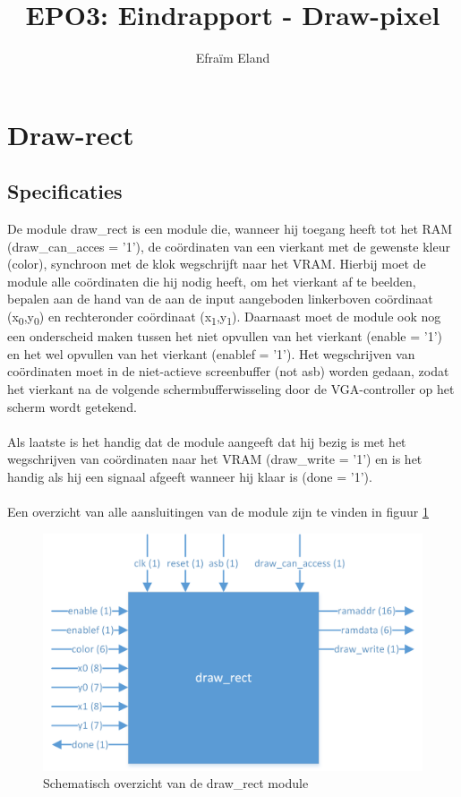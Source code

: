 \documentclass{scrartcl} %
\author{Efraïm Eland}%
\title{EPO3: Eindrapport - Draw-pixel}
\begin{document}
\section{Draw-rect} %
\label{sec:draw-rect}  %

\newcommand{\tss}{\textsubscript}

\subsection{Specificaties}
De module draw\_rect is een module die, wanneer hij toegang heeft tot het RAM (draw\_can\_acces = '1'), de coördinaten van een vierkant met de gewenste kleur (color), synchroon met de klok wegschrijft naar het VRAM. Hierbij moet de module alle coördinaten die hij nodig heeft, om het vierkant af te beelden, bepalen aan de hand van de aan de input aangeboden linkerboven coördinaat (x\tss{0},y\tss{0}) en rechteronder coördinaat (x\tss{1},y\tss{1}). Daarnaast moet de module ook nog een onderscheid maken tussen het niet opvullen van het vierkant (enable = '1') en het wel opvullen van het vierkant (enablef = '1'). Het wegschrijven van coördinaten moet in de niet-actieve screenbuffer (not asb) worden gedaan, zodat het vierkant na de volgende schermbufferwisseling door de VGA-controller op het scherm wordt getekend.
\\\\
Als laatste is het handig dat de module aangeeft dat hij bezig is met het wegschrijven van coördinaten naar het VRAM (draw\_write = '1') en is het handig als hij een signaal afgeeft wanneer hij klaar is (done = '1').
\\\\
Een overzicht van alle aansluitingen van de module zijn te vinden in figuur \ref{fig:draw_rect}

\begin{figure}[H]
	\centering
	\includegraphics[width=\textwidth]{resources/draw_rect.png}
	\caption{Schematisch overzicht van de draw\_rect module}
	\label{fig:draw_rect}
\end{figure}
\end{document}
